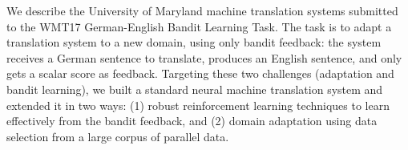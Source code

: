 We describe the University of Maryland machine translation systems submitted to the WMT17 German-English Bandit Learning Task. The task is to adapt a translation system to a new domain, using only bandit feedback: the system receives a German sentence to translate, produces an English sentence, and only gets a scalar score as feedback. Targeting these two challenges (adaptation and bandit learning), we built a standard neural machine translation system and extended it in two ways: (1) robust reinforcement learning techniques to learn effectively from the bandit feedback, and (2) domain adaptation using data selection from a large corpus of parallel data.
